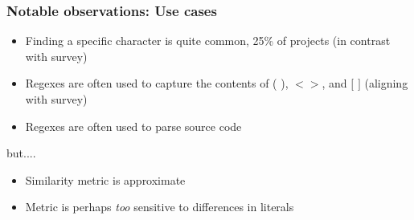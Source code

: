 \begin{frame}
\frametitle{Notable observations: Use cases}

\begin{block}{}
\begin{itemize}
	\item Finding a specific character is quite common, 25\% of projects (in contrast with survey)
	\item Regexes are often used to capture the contents of ( ), $< >$, and $[$ $]$ (aligning with survey)
	\item Regexes are often used to parse source code
\end{itemize}
\end{block}

but....

\begin{block}{}
\begin{itemize}
	\item Similarity metric is approximate
	\item Metric is perhaps \emph{too} sensitive to differences in literals
\end{itemize}
\end{block}

%


\end{frame}

